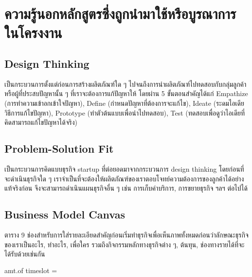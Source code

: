 \section{ความรู้นอกหลักสูตรซึ่งถูกนำมาใช้หรือบูรณาการในโครงงาน}
\subsection{Design Thinking}
เป็นกระบวนการตั้งแต่ก่อนการสร้างผลิตภัณฑ์ใด ๆ ไปจนถึงการนำผลิตภัณฑ์ไปทดสอบกับกลุ่มลูกค้าหรือผู้ที่ประสบปัญหานั้น ๆ ที่เราจะต้องการแก้ปัญหาให้ โดยผ่าน 5 ขั้นตอนสำคัญได้แก่ Empathize (การทำความเข้าอกเข้าใจปัญหา), Define (กำหนดปัญหาที่ต้องการจะแก้ไข), Ideate (ระดมไอเดียวิธีการแก้ไขปัญหา), Prototype (ทำตัวต้นแบบเพื่อนำไปทดสอบ), Test (ทดสอบเพื่อดูว่าไอเดียที่คิดสามารถแก้ไขปัญหาได้จริง)

\subsection{Problem-Solution Fit}
เป็นกระบวนการคิดแบบธุรกิจ startup ที่ต่อยอดมาจากกระบวนการ design thinking โดยก่อนที่จะดำเนินธุรกิจใด ๆ เราจำเป็นที่จะต้องให้ผลิตภัณฑ์ของเราตอบโจทย์ความต้องการของลูกค้าได้อย่างแท้จริงก่อน จึงจะสามารถดำเนินแผนธุรกิจอื่น ๆ เช่น การเก็บค่าบริการ, การขยายธุรกิจ ฯลฯ ต่อไปได้

\subsection{Business Model Canvas}
ตาราง 9 ช่องสำหรับการใส่รายละเอียดสำคัญก่อนเริ่มทำธุรกิจเพื่อเห็นภาพทั้งหมดก่อนว่าลักษณะธุรกิจของเราเป็นอะไร, ทำอะไร, เพื่อใคร รวมถึงกิจกรรมหลักทางธุรกิจต่าง ๆ, ต้นทุน, ช่องทางรายได้ที่จะได้รับด้วยเช่นกัน

amt.of timeslot =  \times ~ \times ~
